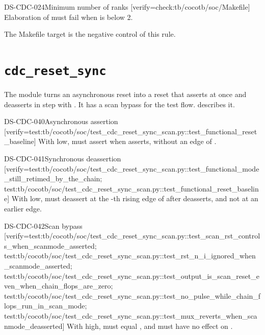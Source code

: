 \begin{requirement}{DS-CDC-024}{Minimum number of ranks}
[verify={check:tb/cocotb/soc/Makefile}]
Elaboration of  must fail when  is below 2.
\end{requirement}
\begin{information}
The Makefile target  is the negative control of this rule.
\end{information}

\section{\texttt{cdc\_reset\_sync}}\label{ds:mod:cdc-reset-sync}
The module  turns an asynchronous reset into a reset that asserts at once and deasserts in step with . It has a scan bypass for the test flow.  describes it.

\begin{requirement}{DS-CDC-040}{Asynchronous assertion}
[verify={test:tb/cocotb/soc/test_cdc_reset_sync_scan.py::test_functional_reset_baseline}]
With  low,  must assert when  asserts, without an edge of .
\end{requirement}

\begin{requirement}{DS-CDC-041}{Synchronous deassertion}
[verify={test:tb/cocotb/soc/test_cdc_reset_sync_scan.py::test_functional_mode_still_retimed_by_the_chain; test:tb/cocotb/soc/test_cdc_reset_sync_scan.py::test_functional_reset_baseline}]
With  low,  must deassert at the -th rising edge of  after  deasserts, and not at an earlier edge.
\end{requirement}

\begin{requirement}{DS-CDC-042}{Scan bypass}
[verify={test:tb/cocotb/soc/test_cdc_reset_sync_scan.py::test_scan_rst_controls_when_scanmode_asserted; test:tb/cocotb/soc/test_cdc_reset_sync_scan.py::test_rst_n_i_ignored_when_scanmode_asserted; test:tb/cocotb/soc/test_cdc_reset_sync_scan.py::test_output_is_scan_reset_even_when_chain_flops_are_zero; test:tb/cocotb/soc/test_cdc_reset_sync_scan.py::test_no_pulse_while_chain_flops_run_in_scan_mode; test:tb/cocotb/soc/test_cdc_reset_sync_scan.py::test_mux_reverts_when_scanmode_deasserted}]
With  high,  must equal , and  must have no effect on .
\end{requirement}

